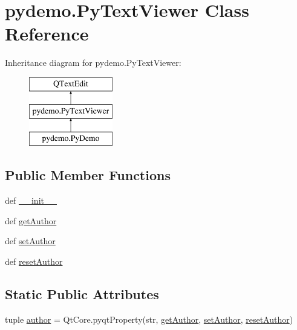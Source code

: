 \hypertarget{classpydemo_1_1PyTextViewer}{}\section{pydemo.\+Py\+Text\+Viewer Class Reference}
\label{classpydemo_1_1PyTextViewer}
Inheritance diagram for pydemo.\+Py\+Text\+Viewer\+:\begin{figure}[H]
\begin{center}
\leavevmode
\includegraphics[height=3.000000cm]{classpydemo_1_1PyTextViewer}
\end{center}
\end{figure}
\subsection*{Public Member Functions}
\begin{DoxyCompactItemize}
\item 
def \hyperlink{classpydemo_1_1PyTextViewer_ac21020d009dcac0e0598513d20d359d3}{\+\_\+\+\_\+init\+\_\+\+\_\+}
\item 
def \hyperlink{classpydemo_1_1PyTextViewer_a44df8ca0f210364b3ddd6e08448f8fcd}{get\+Author}
\item 
def \hyperlink{classpydemo_1_1PyTextViewer_a3fc39ee572a2e41fe00d263a2f436282}{set\+Author}
\item 
def \hyperlink{classpydemo_1_1PyTextViewer_a2cd1c4411c04ebfd6b6555ab2af0b32c}{reset\+Author}
\end{DoxyCompactItemize}
\subsection*{Static Public Attributes}
\begin{DoxyCompactItemize}
\item 
tuple \hyperlink{classpydemo_1_1PyTextViewer_a10ee17032a73f1ac07879680bf7d30e2}{author} = Qt\+Core.\+pyqt\+Property(str, \hyperlink{classpydemo_1_1PyTextViewer_a44df8ca0f210364b3ddd6e08448f8fcd}{get\+Author}, \hyperlink{classpydemo_1_1PyTextViewer_a3fc39ee572a2e41fe00d263a2f436282}{set\+Author}, \hyperlink{classpydemo_1_1PyTextViewer_a2cd1c4411c04ebfd6b6555ab2af0b32c}{reset\+Author})
\end{DoxyCompactItemize}


